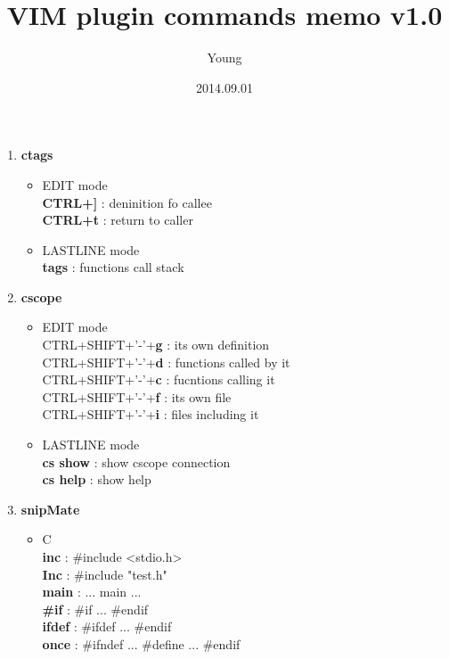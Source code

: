 \documentclass[10pt, a4paper]{article}
\begin{document}
\twocolumn

\pagestyle{empty}
\title{VIM plugin commands memo v1.0}
\author{Young}
\date{2014.09.01}
\maketitle
\thispagestyle{empty} %

\setlength{\baselineskip}{12pt} %

\begin{enumerate}
\item{\textbf{ctags}}
	\begin{itemize}
	\item{EDIT mode} \\
	\textbf{CTRL+]} : deninition fo callee \\
	\textbf{CTRL+t} : return to caller 
	\item{LASTLINE mode} \\
	\textbf{tags} : functions call stack
	\end{itemize}
\item{\textbf{cscope}}
	\begin{itemize}
	\item{EDIT mode} \\
	CTRL+SHIFT+'-'+\textbf{g} : its own definition \\
	CTRL+SHIFT+'-'+\textbf{d} : functions called by it \\
	CTRL+SHIFT+'-'+\textbf{c} : fucntions calling it \\
	CTRL+SHIFT+'-'+\textbf{f} : its own file \\
	CTRL+SHIFT+'-'+\textbf{i} : files including it
	\item{LASTLINE mode} \\
	\textbf{cs show} : show cscope connection \\
	\textbf{cs help} : show help
	\end{itemize}
\item{\textbf{snipMate}}
	\begin{itemize}
	\item C \\
	\textbf{inc} : \#include <stdio.h>  \\
	\textbf{Inc} : \#include "test.h" \\
	\textbf{main} : ... main ... \\
	\textbf{\#if} : \#if ... \#endif \\
	\textbf{ifdef} : \#ifdef ... \#endif \\
	\textbf{once} : \#ifndef ... \#define ... \#endif \\

\end{itemize}
\end{enumerate}
\end{document}
